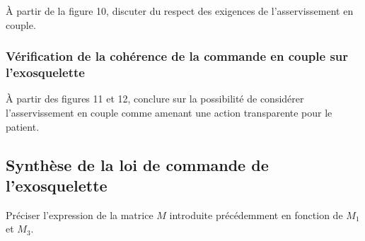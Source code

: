 \documentclass[11pt]{article}
\begin{document}

\UPSTIquestion À partir de la figure 10, discuter du respect des exigences de l'asservissement en couple.
\begin{UPSTIcorrige}

\end{UPSTIcorrige}

\subsubsection{Vérification de la cohérence de la commande en couple sur l’exosquelette}

\UPSTIquestion À partir des figures 11 et 12, conclure sur la possibilité de considérer l'asservissement en couple comme amenant une action transparente pour le patient.
\begin{UPSTIcorrige}

\end{UPSTIcorrige}

\subsection{Synthèse de la loi de commande de l'exosquelette}

\begin{UPSTIcorrige}

\end{UPSTIcorrige}

\UPSTIquestion Préciser l'expression de la matrice $M$ introduite précédemment en fonction de $M_{1}$ et $M_{3}$.
\begin{UPSTIcorrige}

\end{UPSTIcorrige}
\end{document}
